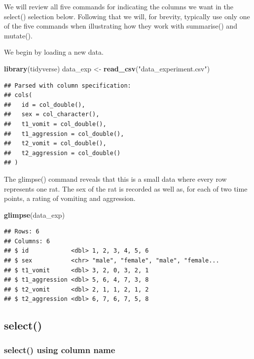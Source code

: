\documentclass[
]{krantz}
\makeatletter
\newenvironment{Shaded}{\begin{snugshade}}{\end{snugshade}}
\newcommand{\KeywordTok}[1]{\textcolor[rgb]{0.27,0.27,0.27}{\textbf{#1}}}
\newcommand{\NormalTok}[1]{#1}
\newcommand{\StringTok}[1]{\textcolor[rgb]{0.5,0.5,0.5}{#1}}
\newenvironment{kframe}{%
\medskip{}
\setlength{\fboxsep}{.8em}
 \def\at@end@of@kframe{}%
 \ifinner\ifhmode%
  \def\at@end@of@kframe{\end{minipage}}%
  \begin{minipage}{\columnwidth}%
 \fi\fi%
 \def\FrameCommand##1{\hskip\@totalleftmargin \hskip-\fboxsep
 \colorbox{shadecolor}{##1}\hskip-\fboxsep
     \hskip-\linewidth \hskip-\@totalleftmargin \hskip\columnwidth}%
 \MakeFramed {\advance\hsize-\width
   \@totalleftmargin\z@ \linewidth\hsize
   \@setminipage}}%
 {\par\unskip\endMakeFramed%
 \at@end@of@kframe}
\renewenvironment{Shaded}{\begin{kframe}}{\end{kframe}}
\makeatother
\begin{document}
We will review all five commands for indicating the columns we want in the select() selection below. Following that we will, for brevity, typically use only one of the five commands when illustrating how they work with summarise() and mutate().

We begin by loading a new data.

\begin{Shaded}
\begin{Highlighting}[]
\KeywordTok{library}\NormalTok{(tidyverse)}
\NormalTok{data_exp <-}\StringTok{ }\KeywordTok{read_csv}\NormalTok{(}\StringTok{"data_experiment.csv"}\NormalTok{)}
\end{Highlighting}
\end{Shaded}

\begin{verbatim}
## Parsed with column specification:
## cols(
##   id = col_double(),
##   sex = col_character(),
##   t1_vomit = col_double(),
##   t1_aggression = col_double(),
##   t2_vomit = col_double(),
##   t2_aggression = col_double()
## )
\end{verbatim}

The glimpse() command reveals that this is a small data where every row represents one rat. The sex of the rat is recorded as well as, for each of two time points, a rating of vomiting and aggression.

\begin{Shaded}
\begin{Highlighting}[]
\KeywordTok{glimpse}\NormalTok{(data_exp)}
\end{Highlighting}
\end{Shaded}

\begin{verbatim}
## Rows: 6
## Columns: 6
## $ id            <dbl> 1, 2, 3, 4, 5, 6
## $ sex           <chr> "male", "female", "male", "female...
## $ t1_vomit      <dbl> 3, 2, 0, 3, 2, 1
## $ t1_aggression <dbl> 5, 6, 4, 7, 3, 8
## $ t2_vomit      <dbl> 2, 1, 1, 2, 1, 2
## $ t2_aggression <dbl> 6, 7, 6, 7, 5, 8
\end{verbatim}

\hypertarget{select-1}{%
\subsection{select()}\label{select-1}}

\hypertarget{select-using-column-name}{%
\subsubsection{select() using column name}\label{select-using-column-name}}
\end{document}
